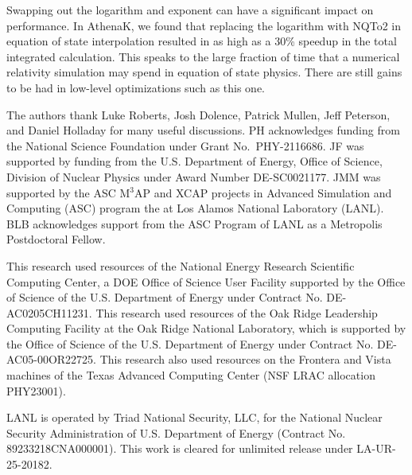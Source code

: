 \documentclass[linenumbers,twocolumn]{aastex631}
\begin{document}
Swapping out the logarithm and exponent can have a significant impact on performance. In AthenaK, we found that replacing the logarithm with NQTo2 in equation of state interpolation resulted in as high as a 30\% speedup in the total integrated calculation. This speaks to the large fraction of time that a numerical relativity simulation may spend in equation of state physics. There are still gains to be had in low-level optimizations such as this one.

\begin{acknowledgments}
The authors thank Luke Roberts, Josh Dolence, Patrick Mullen, Jeff Peterson, and Daniel Holladay for many useful discussions. PH acknowledges funding from the National Science Foundation under Grant No.~PHY-2116686. JF was supported by funding from the U.S. Department of Energy, Office of Science, Division of Nuclear Physics under Award Number DE-SC0021177. JMM was supported by the ASC M$^3$AP and XCAP projects in Advanced Simulation and Computing (ASC) program the at Los Alamos National Laboratory (LANL). 
BLB acknowledges support from the ASC Program of LANL as a Metropolis Postdoctoral Fellow.

This research used resources of the National Energy Research Scientific Computing Center, a DOE Office of Science User Facility supported by the Office of Science of the U.S. Department of Energy under Contract No. DE-AC0205CH11231. This research used resources of the Oak Ridge Leadership Computing Facility at the Oak Ridge National Laboratory, which is supported by the Office of Science of the U.S. Department of Energy under Contract No. DE-AC05-00OR22725. This research also used resources on the Frontera and Vista machines of the Texas Advanced Computing Center (NSF LRAC allocation PHY23001).

LANL is operated by Triad National Security, LLC, for the National Nuclear Security Administration of U.S. Department of Energy (Contract No. 89233218CNA000001). This work is cleared for unlimited release under LA-UR-25-20182.
\end{acknowledgments}

\end{document}
